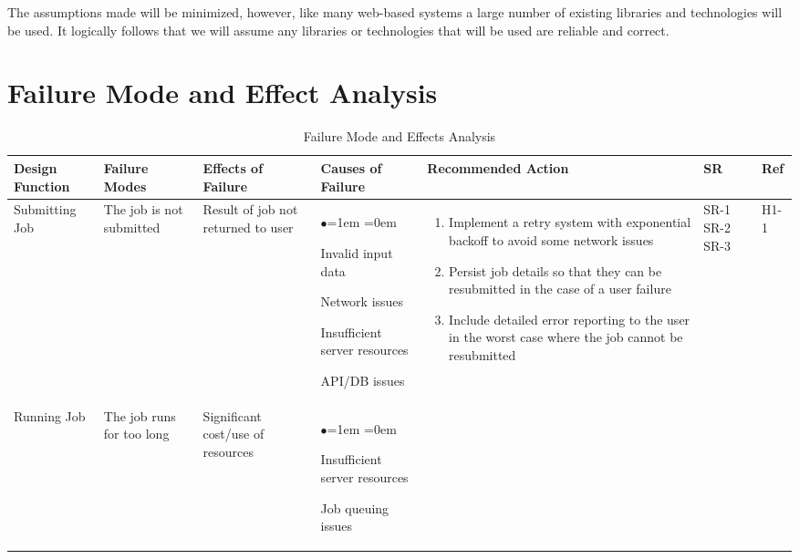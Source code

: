 \documentclass{article}
\begin{document}
The assumptions made will be minimized, however, like many web-based systems a large number of existing libraries and technologies will be used. It logically follows that we will assume any libraries or technologies that will be used are reliable and correct.

\section{Failure Mode and Effect Analysis}

\begin{table}[H]
    \centering
    \caption{Failure Mode and Effects Analysis} \label{TblFMEA}
    \begin{tabularx}{\textwidth}{|P{2cm}|P{2cm}|P{2cm}|P{2cm}|P{3.45cm}|P{1cm}|P{1cm}|}
        \hline
        Design Function & Failure Modes & Effects of Failure & Causes of Failure & Recommended Action & SR & Ref\\
        \hline
        Submitting Job & The job is not submitted & Result of job not returned to user & 
        \begin{list}{$\bullet$}{\leftmargin=1em \itemindent=0em}
            \item Invalid input data
            \item Network issues
            \item Insufficient server resources
            \item API/DB issues
        \end{list}
        &
        \begin{enumerate}[label=(\alph*)]{\leftmargin=1em \itemindent=0em}
            \item Implement a retry system with exponential backoff to avoid some network issues
            \item Persist job details so that they can be resubmitted in the case of a user failure
            \item Include detailed error reporting to the user in the worst case where the job cannot be resubmitted
        \end{enumerate}
        & SR-1 SR-2 SR-3 & H1-1\\
        \hline
        Running Job & The job runs for too long & Significant cost/use of resources & 
        \begin{list}{$\bullet$}{\leftmargin=1em \itemindent=0em}
            \item Insufficient server resources
            \item Job queuing issues

\end{list}
\end{tabularx}
\end{table}
\end{document}
